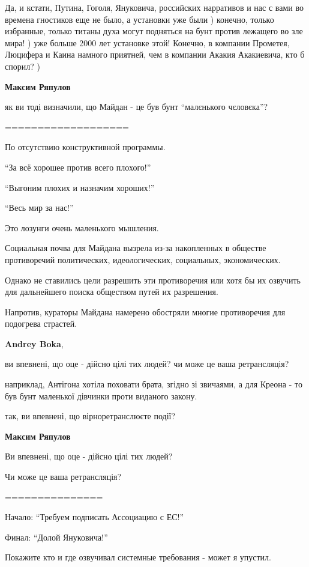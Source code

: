 \begin{itemize}
\begin{itemize}
Да, и кстати, Путина, Гоголя, Януковича, российских нарративов и нас с вами во
времена гностиков еще не было, а установки уже были ) конечно, только
избранные, только титаны духа могут подняться на бунт против лежащего во зле
мира! ) уже больше 2000 лет установке этой! Конечно, в компании Прометея,
Люцифера и Каина намного приятней, чем в компании Акакия Акакиевича, кто б
спорил? )

\textbf{Максим Ряпулов} 

як ви тоді визначили, що Майдан - це був бунт \enquote{малєнького чєловєка}?

===================

По отсутствию конструктивной программы.

\enquote{За всё хорошее против всего плохого!}

\enquote{Выгоним плохих и назначим хороших!}

\enquote{Весь мир за нас!}

Это лозунги очень маленького мышления.

Социальная почва для Майдана вызрела из-за накопленных в обществе противоречий
политических, идеологических, социальных, экономических.

Однако не ставились цели разрешить эти противоречия или хотя бы их озвучить для
дальнейшего поиска обществом путей их разрешения.

Напротив, кураторы Майдана намерено обостряли многие противоречия для подогрева
страстей.

\textbf{Andrey Boka}, 

ви впевнені, що оце - дійсно цілі тих людей? чи може це ваша ретрансляція?

наприклад, Антігона хотіла поховати брата, згідно зі звичаями, а для Креона -
то був бунт маленької дівчинки проти виданого закону.

так, ви впевнені, що вірноретранслюєте події?

\textbf{Максим Ряпулов} 

Ви впевнені, що оце - дійсно цілі тих людей?

Чи може це ваша ретрансляція?

===============

Начало: \enquote{Требуем подписать Ассоциацию с ЕС!}

Финал: \enquote{Долой Януковича!}

Покажите кто и где озвучивал системные требования - может я упустил.


\end{itemize}
\end{itemize}
